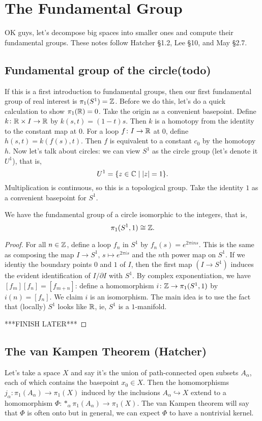 \section{The Fundamental Group}
OK guys, let's decompose big spaces into smaller ones and compute their fundamental groups. These notes follow Hatcher \S 1.2, Lee \S 10, and May \S 2.7.
\subsection{Fundamental group of the circle(todo)}
If this is a first introduction to fundamental groups, then our first fundamental group of real interest is $\pi_1(S^{1} )=\mathbb{Z}$. Before we do this, let's do a quick calculation to show $\pi_1(\mathbb{R})=0$. Take the origin as a convenient basepoint. Define $k \colon \mathbb{R}\times I \to \mathbb{R}$ by $k(s,t)=(1-t)s$. Then $k$ is a homotopy from the identity to the constant map at $0$. For a loop $f \colon I \to \mathbb{R}$ at $0$, define $h(s,t)=k(f(s),t).$ Then $f$ is equivalent to a constant $c_0$ by the homotopy $h$.
\orbreak
Now let's talk about circles: we can view $S^{1} $ as the circle group (let's denote it $U^1$), that is, \[
U^1 = \{z\in \mathbb{C}\mid |z|=1\}.
\] Multiplication is continuous, so this is a topological group. Take the identity $1$ as a convenient basepoint for  $S^{1} $.
\begin{theorem}
    We have the fundamental group of a circle isomorphic to the integers, that is, \[
        \pi_1(S^{1} ,1)\cong\mathbb{Z}.
    \] 
\end{theorem}
\begin{proof}
    For all $n\in \mathbb{Z}$, define a loop $f_n$ in $S^{1} $ by $f_n(s)=e^{2\pi i ns}$. This is the same as composing the map $I\to S^{1},\, s\mapsto e^{2\pi is}$ and the $n$th power map on $S^{1} $. If we identiy the boundary points $0$ and $1$ of $I$, then the first map $(I \to S^{1} )$ induces the evident identification of $I / \partial I$ with $S^{1} $. By complex exponentiation, we have $[f_m][f_n]=[f_{m+n}]$: define a homomorphism $i \colon \mathbb{Z} \to \pi_1(S^{1} ,1)$ by $i(n)=[f_n]$. We claim $i$ is an isomorphism. The main idea is to use the fact that (locally) $S^{1} $ looks like $\mathbb{R}$, ie, $S^{1} $ is a $1$-manifold.

    ***FINISH LATER***
\end{proof}


\subsection{The van Kampen Theorem (Hatcher)}
Let's take a space $X$ and say it's the union of path-connected open subsets $A_{\alpha}$, each of which contains the basepoint $x_0\in X$. Then the homomorphisms $j_{\alpha} \colon \pi_1(A_{\alpha}) \to \pi_1(X)$ induced by the inclusions $A_{\alpha}\hookrightarrow X$ extend to a homomorphism $\Phi \colon *_{\alpha}\pi_1(A_{\alpha}) \to \pi_1(X)$. The van Kampen theorem will say that $\Phi$ is often onto but in general, we can expect $\Phi$ to have a nontrivial kernel. 

